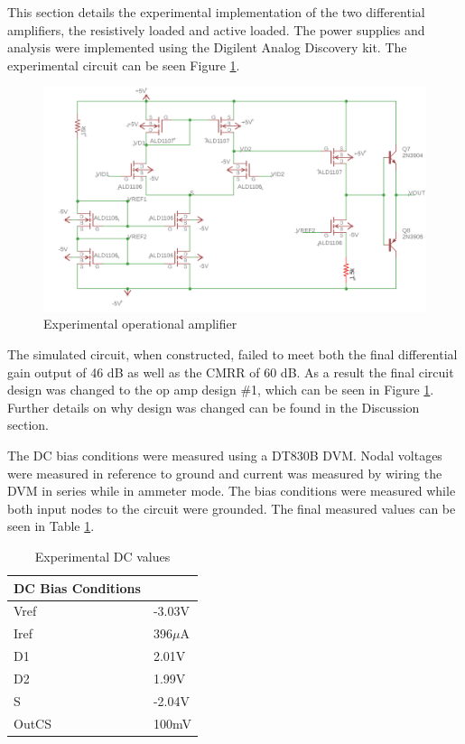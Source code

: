 




This section details the experimental implementation of the two differential amplifiers, the resistively loaded and active loaded. The power supplies and analysis were implemented using the Digilent Analog Discovery kit. The experimental circuit can be seen Figure \ref{fig:expercircuit}.

\begin{figure}[H]
	\begin{center}
		\includegraphics[scale=.40]{ExperimentalImplementation/final_schem.png}
		\caption{Experimental operational amplifier}
		\label{fig:expercircuit}
	\end{center}
\end{figure}
The simulated circuit, when constructed, failed to meet both the final differential gain output of 46 dB as well as the CMRR of 60 dB. As a result the final circuit design was changed to the op amp design \#1, which can be seen in Figure \ref{fig:expercircuit}. Further details on why design was changed can be found in the Discussion section.

The DC bias conditions were measured using a DT830B DVM. Nodal voltages were measured in reference to ground and current was measured by wiring the DVM in series while in ammeter mode. The bias conditions were measured while both input nodes to the circuit were grounded. The final measured values can be seen in Table \ref{tab:expdc}.


\begin{table}[H]
	\centering
	\caption{Experimental DC values}
	\label{tab:expdc}
	\begin{tabular}{|l|l|}
		\hline
		\textbf{DC Bias Conditions} &           \\ \hline
		Vref                        & -3.03V    \\ \hline
		Iref                        & 396$\mu$A \\ \hline
		D1                          & 2.01V     \\ \hline
		D2                          & 1.99V     \\ \hline
		S                           & -2.04V    \\ \hline
		OutCS                       & 100mV      \\ \hline
	\end{tabular}
\end{table}

